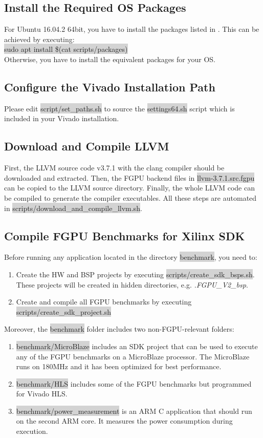 \documentclass[11pt]{article}
\begin{document}
\subsection{Install the Required OS Packages}
    For Ubuntu 16.04.2 64bit, you have to install the packages listed in .
    This can be achieved by executing: \\
    \centering \colorbox{lightGray}{ sudo apt install \$(cat scripts/packages) }\\
\justify
Otherwise, you have to install the equivalent packages for your OS.

\subsection{Configure the Vivado Installation Path}
Please edit \colorbox{lightGray}{script/set\_paths.sh} to source the \colorbox{lightGray}{settings64.sh} script
which is included in your Vivado installation.

\subsection{Download and Compile LLVM}
First, the LLVM source code v3.7.1 with the clang compiler should be downloaded and extracted.
Then, the FGPU backend files in \colorbox{lightGray}{llvm-3.7.1.src.fgpu} can be copied to the LLVM source directory.
Finally, the whole LLVM code can be compiled to generate the compiler executables.
All these steps are automated in \colorbox{lightGray}{scripts/download\_and\_compile\_llvm.sh}.

\subsection{Compile FGPU Benchmarks for Xilinx SDK}
Before running any application located in the directory \colorbox{lightGray}{benchmark}, you need to:
\begin{enumerate}
  \item Create the HW and BSP projects by executing \colorbox{lightGray}{scripts/create\_sdk\_bsps.sh}.
    These projects will be created in hidden directories, e.g. \emph{.FGPU\_V2\_bsp}.
  \item Create and compile all FGPU benchmarks by executing \colorbox{lightGray}{scripts/create\_sdk\_project.sh}
\end{enumerate}
Moreover, the \colorbox{lightGray}{benchmark} folder includes two non-FGPU-relevant folders:
\begin{enumerate}
  \item \colorbox{lightGray}{benchmark/MicroBlaze} includes an SDK project that can be used to execute any of the FGPU benchmarks 
    on a MicroBlaze processor.
    The MicroBlaze runs on 180MHz and it has been optimized for best performance.
  \item \colorbox{lightGray}{benchmark/HLS} includes some of the FGPU benchmarks but programmed for Vivado HLS.
  \item \colorbox{lightGray}{benchmark/power\_measurement} is an ARM C application that should run on the second ARM core.
    It measures the power consumption during execution.
\end{enumerate}
\end{document}
